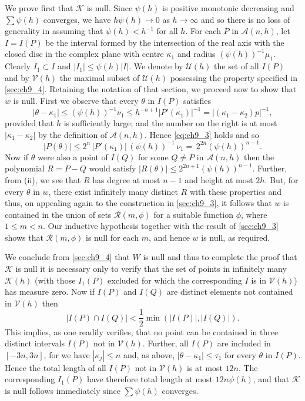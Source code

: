 We prove first that $\mathscr{K}$ is null. Since $\psi(h)$ is positive monotonic decreasing and $\sum \psi(h)$ converges, we have $h\psi(h) \to 0$ as $h \to \infty$ and so there is no loss of generality in assuming that $\psi(h) < h^{-1}$ for all $h$. For each $P$ in $\mathscr{A}(n,h)$, let $I=I(P)$ be the interval formed by the intersection of the real axis with the closed disc in the complex plane with centre $\kappa_1$ and radius $(\psi(h))^{-1}\mu_1$. Clearly $I_1 \subset I$ and $|I_1| \leq \psi(h) |I|$. We denote by $\mathscr{U}(h)$ the set of all $I(P)$ and by $\mathscr{V}(h)$ the maximal subset of $\mathscr{U}(h)$ possessing the property specified in \autoref{sec:ch9_4}. Retaining the notation of that section, we proceed now to show that $w$ is null. First we observe that every $\theta$ in $I(P)$ satisfies
\[\left|\theta - \kappa_{1}\right| \leq (\psi(h))^{-1} \nu_{1} \leq h^{-n+1} |P'(\kappa_{1})|^{-1} = \left|(\kappa_{1} - \kappa_{2}) p\right|^{-1}, \tag{7}\label{eq:ch9_7}\]
provided that $h$ is sufficiently large; and the number on the right is at most $|\kappa_1 - \kappa_2|$ by the definition of $\mathscr{A}(n, h)$. Hence \eqref{eq:ch9_3} holds and so
\[\big|P(\theta)\big|\leqslant 2^n\, \big|P'(\kappa_1)\big|\, (\psi(h))^{-1}\, \nu_1=\, 2^{2n}(\psi(h))^{n-1}.\]
Now if $\theta$ were also a point of $I(Q)$ for some $Q \neq P$ in $\mathscr{A}(n,h)$ then the polynomial $R = P - Q$ would satisfy $|R(\theta)| \leq 2^{2n+1} (\psi(h))^{n-1}$. Further, from (ii), we see that $R$ has degree at most $n-1$ and height at most $2h$. But, for every $\theta$ in $w$, there exist infinitely many distinct $R$ with these properties and thus, on appealing again to the construction in \autoref{sec:ch9_3}, it follows that $w$ is contained in the union of sets $\mathscr{R}(m,\phi)$ for a suitable function $\phi$, where $1 \leq m < n$. Our inductive hypothesis together with the result of \autoref{sec:ch9_3} shows that $\mathscr{R}(m,\phi)$ is null for each $m$, and hence $w$ is null, as required.

We conclude from \autoref{sec:ch9_4} that $W$ is null and thus to complete the proof that $\mathscr{K}$ is null it is necessary only to verify that the set of points in infinitely many $\mathscr{K}(h)$ (with those $I_1(P)$ excluded for which the corresponding $I$ is in $\mathscr{V}(h)$) has measure zero. Now if $I(P)$ and $I(Q)$ are distinct elements not contained in $\mathscr{V}(h)$ then
\[|I(P) \cap I(Q)| < \frac{1}{2} \min(|I(P)|, |I(Q)|).\]
This implies, as one readily verifies, that no point can be contained in three distinct intervals $I(P)$ not in $\mathscr{V}(h)$. Further, all $I(P)$ are included in $[-3n,3n]$, for we have $|\kappa_j| \leq n$ and, as above, $|\theta-\kappa_1| \leq \tau_1$ for every $\theta$ in $I(P)$. Hence the total length of all $I(P)$ not in $\mathscr{V}(h)$ is at most $12n$. The corresponding $I_1(P)$ have therefore total length at most $12n\psi(h)$, and that $\mathscr{K}$ is null follows immediately since $\sum \psi(h)$ converges.

